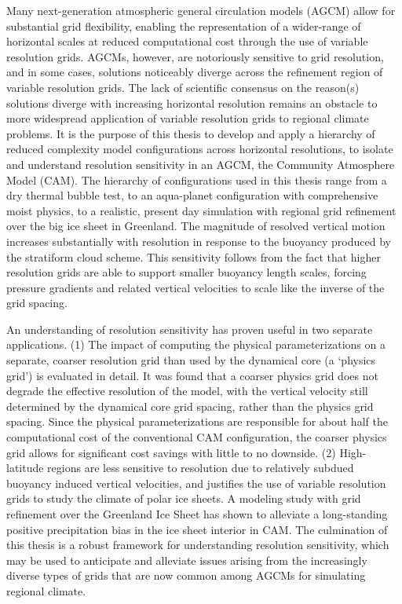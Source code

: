 Many next-generation atmospheric general circulation models (AGCM) allow for substantial grid flexibility, enabling the representation of a wider-range of horizontal scales at reduced computational cost through the use of variable resolution grids. AGCMs, however, are notoriously sensitive to grid resolution, and in some cases, solutions noticeably diverge across the refinement region of variable resolution grids. The lack of scientific consensus on the reason(s) solutions diverge with increasing horizontal resolution remains an obstacle to more widespread application of variable resolution grids to regional climate problems. It is the purpose of this thesis to develop and apply a hierarchy of reduced complexity model configurations across horizontal resolutions, to isolate and understand resolution sensitivity in an AGCM, the Community Atmosphere Model (CAM). The hierarchy of configurations used in this thesis range from a dry thermal bubble test, to an aqua-planet configuration with comprehensive moist physics, to a realistic, present day simulation with regional grid refinement over the big ice sheet in Greenland. The magnitude of resolved vertical motion increases substantially with resolution in response to the buoyancy produced by the stratiform cloud scheme. This sensitivity follows from the fact that higher resolution grids are able to support smaller buoyancy length scales, forcing pressure gradients and related vertical velocities to scale like the inverse of the grid spacing.

An understanding of resolution sensitivity has proven useful in two separate applications. (1) The impact of computing the physical parameterizations on a separate, coarser resolution grid than used by the dynamical core (a `physics grid') is evaluated in detail. It was found that a coarser physics grid does not degrade the effective resolution of the model, with the vertical velocity still determined by the dynamical core grid spacing, rather than the physics grid spacing. Since the physical parameterizations are responsible for about half the computational cost of the conventional CAM configuration, the coarser physics grid allows for significant cost savings with little to no downside. (2) High-latitude regions are less sensitive to resolution due to relatively subdued buoyancy induced vertical velocities, and justifies the use of variable resolution grids to study the climate of polar ice sheets. A modeling study with grid refinement over the Greenland Ice Sheet has shown to alleviate a long-standing positive precipitation bias in the ice sheet interior in CAM. The culmination of this thesis is a robust framework for understanding resolution sensitivity, which may be used to anticipate and alleviate issues arising from the increasingly diverse types of grids that are now common among AGCMs for simulating regional climate.